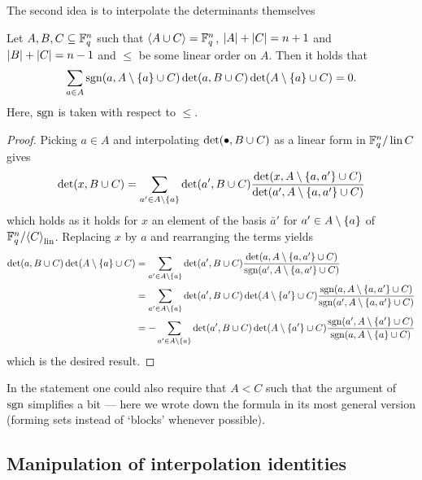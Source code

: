 The second idea is to interpolate the determinants themselves
\begin{lemma}\label{mds-tan-poly-interpol-det}
    Let $A,B,C\subseteq \mathbb{F}_{q}^n$ such that $\gen{A\setjoin
    C}=\field{q}^n$, $\left|A\right|+\left|C\right|=n+1$ and $\left|B\right|+\left|C\right|=n-1$ and $\leq$
    be some linear order on $A$. Then it holds that
    $$
    \sum_{a\in A}{\sgn(a,A\setminus\set a\setjoin C)\det(a,B\setjoin C)\det(A\setminus\set a\setjoin C)}=0\text{.}
    $$
    Here, $\mathop\mathrm{sgn}$ is taken with respect to $\leq$.
\end{lemma}

\begin{proof}
  Picking $a\in A$ and interpolating $\det(\bullet,B\cup C)$ as a linear form in
  $\mathbb{F}_{q}^n/\mathop\mathrm{lin}{C}$ gives
  $$
  \det(x,B\setjoin C) 
  = \sum_{a'\in A\setminus\set a}{\det(a',B\setjoin C)\frac{\det(x,A\setminus\set{a,a'}\setjoin C)}{\det(a',A\setminus\set{a,a'}\setjoin C)}}
  $$
  which holds as it holds for $x$ an element of the basis $\bar a'$ for $a'\in
  A\setminus\set a$ of $\field{q}^n/\gen{C}_{\lin}$. Replacing $x$ by $a$ and
  rearranging the terms yields
  \begin{align*}
    \det(a,B\setjoin C)\det(A\setminus\set a\setjoin C)
    &= 
    \sum_{a'\in A\setminus\set a}{\det(a',B\setjoin C)\frac{\det(a,A\setminus\set{a,a'}\setjoin C)}{\sgn(a',A\setminus\set{a,a'}\setjoin C)}}\\
    &= 
    \sum_{a'\in A\setminus\set a}{\det(a',B\setjoin C)\det(A\setminus\set {a'}\setjoin C)\frac{\sgn(a,A\setminus\set{a,a'}\setjoin C)}{\sgn(a',A\setminus\set{a,a'}\setjoin C)}}\\
    &= 
    -\sum_{a'\in A\setminus\set a}{\det(a',B\setjoin C)\det(A\setminus\set{a'}\setjoin C)\frac{\sgn(a',A\setminus\set{a'}\setjoin C)}{\sgn(a,A\setminus\set a\setjoin C)}}
  \end{align*}
  which is the desired result.
\end{proof}

\begin{remark}
    In the statement one could also require that $A<C$ such that the argument of $\mathop\mathrm{sgn}$ simplifies a bit --- here we wrote down the formula in its most general version (forming sets instead of `blocks' whenever possible).
\end{remark}

\subsection{Manipulation of interpolation identities}

